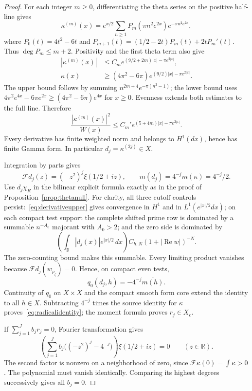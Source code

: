 \documentclass[11pt,a4paper]{article}
\numberwithin{equation}{section}
\theoremstyle{remark}
\newcommand{\R}{\mathbb R}
\begin{document}
\begin{proof}
For each integer $m\ge0$, differentiating the theta series on the positive half-line gives
\[
 \kappa^{(m)}(x)=e^{x/2}\sum_{n\ge1}P_m(\pi n^2e^{2x})e^{-\pi n^2e^{2x}},
\]
where $P_0(t)=4t^2-6t$ and
$P_{m+1}(t)=(1/2-2t)P_m(t)+2tP_m'(t)$.
Thus $\deg P_m\le m+2$. Positivity and the first theta term also give
\begin{align}
 |\kappa^{(m)}(x)|&\le C_m
        e^{(9/2+2m)|x|-\pi e^{2|x|}},\label{eq:derivativeupper}\\
 \kappa(x)&\ge(4\pi^2-6\pi)
        e^{(9/2)|x|-\pi e^{2|x|}}.\label{eq:thetalower}
\end{align}
The upper bound follows by summing
$n^{2m+4}e^{-\pi(n^2-1)}$; the lower bound uses
$4\pi^2e^{4x}-6\pi e^{2x}\ge(4\pi^2-6\pi)e^{4x}$ for $x\ge0$.
Evenness extends both estimates to the full line. Therefore
\begin{equation}\label{eq:derivativeweighted}
 \frac{|\kappa^{(m)}(x)|^2}{W(x)}
 \le C_m'e^{(5+4m)|x|-\pi e^{2|x|}}.
\end{equation}
Every derivative has finite weighted norm and belongs to $H^1(dx)$, hence has finite Gamma form. In particular $d_j=\kappa^{(2j)}\in X$.

Integration by parts gives
\[
 \mathcal Fd_j(z)=(-z^2)^j\xi(1/2+iz),\qquad
 m(d_j)=4^{-j}m(\kappa)=4^{-j}/2.
\]
Use $d_j\chi_R$ in the bilinear explicit formula exactly as in the proof of Proposition~\ref{prop:thetanull}. For clarity, all three cutoff controls persist:~\eqref{eq:derivativeupper} gives convergence in $H^1$ and in $L^1(e^{|x|/2}dx)$; on each compact test support the complete shifted prime row is dominated by a summable $n^{-A_0}$ majorant with $A_0>2$; and the zero side is dominated by
\[
 \left(\int_\R|d_j(x)|e^{|x|/2}\,dx\right)
 C_{h,N}(1+|\operatorname{Re}w|)^{-N}.
\]
The zero-counting bound makes this summable. Every limiting product vanishes because $\mathcal Fd_j(w_{\rho_\zeta})=0$. Hence, on compact even tests,
\[
 q_0(d_j,h)=-4^{-j}\overline{m(h)}.
\]
Continuity of $q_0$ on $X\times X$ and the compact smooth form core extend the identity to all $h\in X$. Subtracting $4^{-j}$ times the source identity for $\kappa$ proves~\eqref{eq:radicalidentity}; the moment formula proves $r_j\in X_c$.

If $\sum_{j=1}^Jb_jr_j=0$, Fourier transformation gives
\[
 \left(\sum_{j=1}^Jb_j\bigl((-z^2)^j-4^{-j}\bigr)\right)
                 \xi(1/2+iz)=0\qquad(z\in\R).
\]
The second factor is nonzero on a neighborhood of zero, since
$\mathcal F\kappa(0)=\int\kappa>0$. The polynomial must vanish identically. Comparing its highest degrees successively gives all $b_j=0$.
\end{proof}
\end{document}
